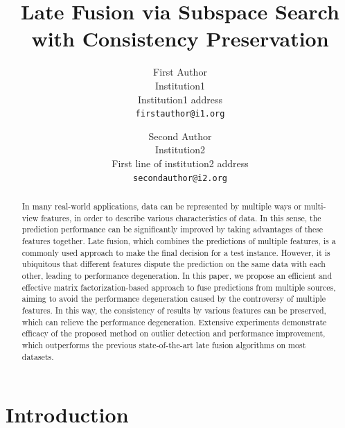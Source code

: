 \documentclass[10pt,twocolumn,letterpaper]{article}
\begin{document}
\title{Late Fusion via Subspace Search with Consistency Preservation}

\author{First Author\\
Institution1\\
Institution1 address\\
{\tt\small firstauthor@i1.org}
\and
Second Author\\
Institution2\\
First line of institution2 address\\
{\tt\small secondauthor@i2.org}
}

\maketitle


\begin{abstract}
In many real-world applications, data can be represented by multiple ways or multi-view features, in order to describe various characteristics of data.
In this sense, the prediction performance can be significantly improved by taking advantages of these features together.
Late fusion, which combines the predictions of multiple features, is a commonly used approach to make the final decision for a test instance.
However, it is ubiquitous that different features dispute the prediction on the same data with each other, leading to  performance degeneration.
In this paper, we propose an efficient and effective matrix factorization-based approach to fuse predictions from multiple sources,
aiming to avoid the performance degeneration caused by the controversy of multiple features. In this way, the consistency of results by various features can be preserved, which can relieve the performance degeneration.
Extensive experiments demonstrate efficacy of the proposed method on outlier detection and performance improvement,
which outperforms the previous state-of-the-art late fusion algorithms on most datasets.

\end{abstract}

\section{Introduction}
\end{document}
